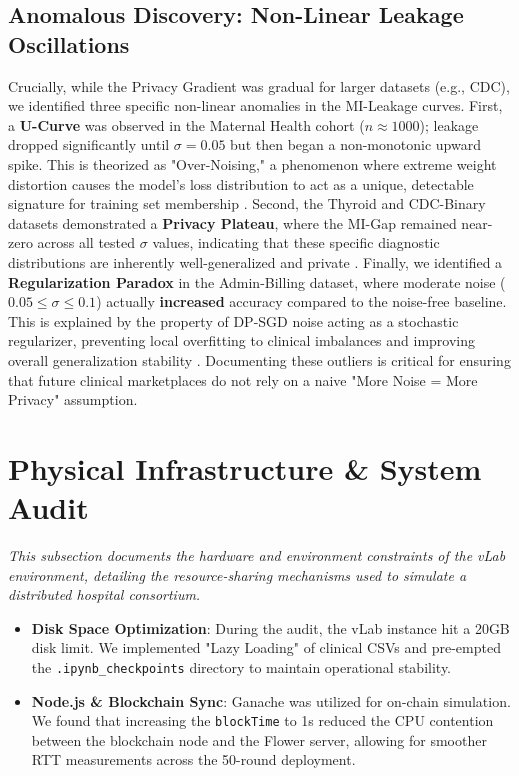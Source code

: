\documentclass[10pt, a4paper, twocolumn]{article}
\begin{document}
\subsection{Anomalous Discovery: Non-Linear Leakage Oscillations}
Crucially, while the Privacy Gradient was gradual for larger datasets (e.g., CDC), we identified three specific non-linear anomalies in the MI-Leakage curves. First, a \textbf{U-Curve} was observed in the Maternal Health cohort ($n \approx 1000$); leakage dropped significantly until $\sigma=0.05$ but then began a non-monotonic upward spike. This is theorized as "Over-Noising," a phenomenon where extreme weight distortion causes the model's loss distribution to act as a unique, detectable signature for training set membership \cite{yeom2018}. Second, the Thyroid and CDC-Binary datasets demonstrated a \textbf{Privacy Plateau}, where the MI-Gap remained near-zero across all tested $\sigma$ values, indicating that these specific diagnostic distributions are inherently well-generalized and private \cite{nasr2019}. Finally, we identified a \textbf{Regularization Paradox} in the Admin-Billing dataset, where moderate noise ($0.05 \le \sigma \le 0.1$) actually \textbf{increased} accuracy compared to the noise-free baseline. This is explained by the property of DP-SGD noise acting as a stochastic regularizer, preventing local overfitting to clinical imbalances and improving overall generalization stability \cite{hardt2016}. Documenting these outliers is critical for ensuring that future clinical marketplaces do not rely on a naive "More Noise = More Privacy" assumption.

\section{Physical Infrastructure \& System Audit}

\textit{This subsection documents the hardware and environment constraints of the vLab environment, detailing the resource-sharing mechanisms used to simulate a distributed hospital consortium.}

\begin{itemize}
    \item \textbf{Disk Space Optimization}: During the audit, the vLab instance hit a 20GB disk limit. We implemented "Lazy Loading" of clinical CSVs and pre-empted the \texttt{.ipynb\_checkpoints} directory to maintain operational stability.
    \item \textbf{Node.js \& Blockchain Sync}: Ganache was utilized for on-chain simulation. We found that increasing the \texttt{blockTime} to 1s reduced the CPU contention between the blockchain node and the Flower server, allowing for smoother RTT measurements across the 50-round deployment.
\end{itemize}
\end{document}
